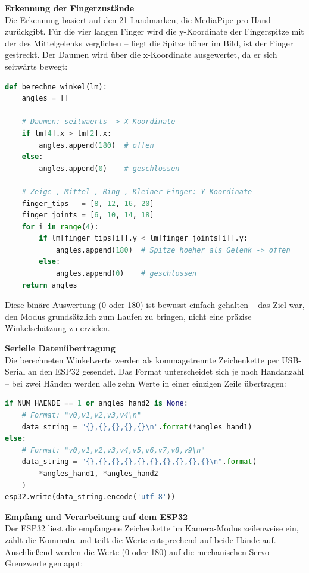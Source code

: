 \documentclass[12pt,a4paper]{article}
\begin{document}
\vspace{0.5em}
\textbf{Erkennung der Fingerzustände} \\
Die Erkennung basiert auf den 21 Landmarken, die MediaPipe pro Hand zurückgibt. Für die vier langen Finger wird die y-Koordinate der Fingerspitze mit der des Mittelgelenks verglichen -- liegt die Spitze höher im Bild, ist der Finger gestreckt. Der Daumen wird über die x-Koordinate ausgewertet, da er sich seitwärts bewegt:

\begin{lstlisting}[language=Python, caption={Funktion berechne\_winkel() -- Offen/Zu-Klassifikation aller 5 Finger}]
def berechne_winkel(lm):
    angles = []

    # Daumen: seitwaerts -> X-Koordinate
    if lm[4].x > lm[2].x:
        angles.append(180)  # offen
    else:
        angles.append(0)    # geschlossen

    # Zeige-, Mittel-, Ring-, Kleiner Finger: Y-Koordinate
    finger_tips   = [8, 12, 16, 20]
    finger_joints = [6, 10, 14, 18]
    for i in range(4):
        if lm[finger_tips[i]].y < lm[finger_joints[i]].y:
            angles.append(180)  # Spitze hoeher als Gelenk -> offen
        else:
            angles.append(0)    # geschlossen
    return angles
\end{lstlisting}

Diese binäre Auswertung (0 oder 180) ist bewusst einfach gehalten -- das Ziel war, den Modus grundsätzlich zum Laufen zu bringen, nicht eine präzise Winkelschätzung zu erzielen.

\vspace{0.5em}
\textbf{Serielle Datenübertragung} \\
Die berechneten Winkelwerte werden als kommagetrennte Zeichenkette per USB-Serial an den ESP32 gesendet. Das Format unterscheidet sich je nach Handanzahl -- bei zwei Händen werden alle zehn Werte in einer einzigen Zeile übertragen:

\begin{lstlisting}[language=Python, caption={Daten senden: Format für 1 oder 2 Hände}]
if NUM_HAENDE == 1 or angles_hand2 is None:
    # Format: "v0,v1,v2,v3,v4\n"
    data_string = "{},{},{},{},{}\n".format(*angles_hand1)
else:
    # Format: "v0,v1,v2,v3,v4,v5,v6,v7,v8,v9\n"
    data_string = "{},{},{},{},{},{},{},{},{},{}\n".format(
        *angles_hand1, *angles_hand2
    )
esp32.write(data_string.encode('utf-8'))
\end{lstlisting}

\vspace{0.5em}
\textbf{Empfang und Verarbeitung auf dem ESP32} \\
Der ESP32 liest die empfangene Zeichenkette im Kamera-Modus zeilenweise ein, zählt die Kommata und teilt die Werte entsprechend auf beide Hände auf. Anschließend werden die Werte (0 oder 180) auf die mechanischen Servo-Grenzwerte gemappt:
\end{document}
